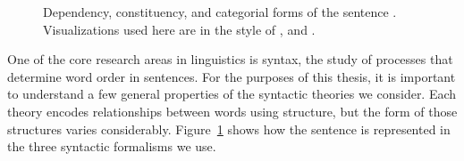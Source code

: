 \begin{figure}
{{
  }
  }
  \caption[Dependency, constituency, and categorial forms of the sentence .]{
    \label{fig:syntax} Dependency, constituency, and categorial forms of the sentence .
    Visualizations used here are in the style of \textcite[][dependency]{ud}, \textcite[][constituency]{ptb-guide} and \textcite[][categorial]{Steedman:2000}.
  }
\end{figure}

One of the core research areas in linguistics is syntax, the study of processes that determine word order in sentences.
For the purposes of this thesis, it is important to understand a few general properties of the syntactic theories we consider.
Each theory encodes relationships between words using structure, but the form of those structures varies considerably.
Figure~\ref{fig:syntax} shows how the sentence  is represented in the three syntactic formalisms we use.

